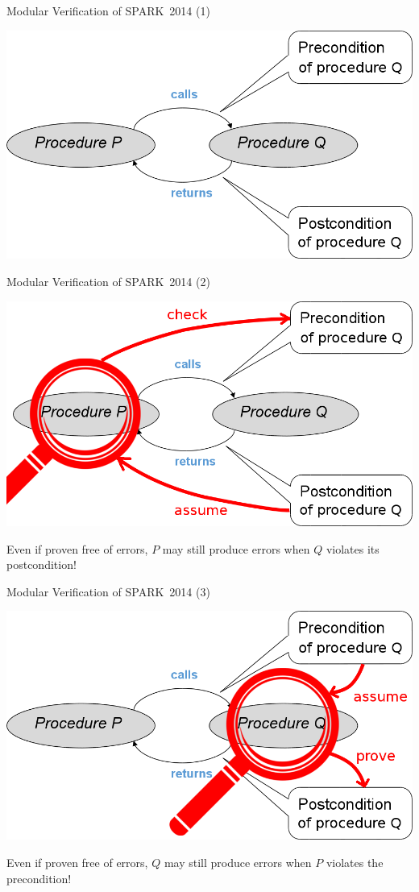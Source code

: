 \begin{frame}[fragile]{Modular Verification of SPARK~2014 (1)}
  \begin{center}
    \includegraphics[width=.9\textwidth]{content/images/spark/pre-post}    
  \end{center}
\end{frame}
\begin{frame}[fragile]{Modular Verification of SPARK~2014 (2)} 
  \begin{center}
    \includegraphics[width=.9\textwidth]{content/images/spark/pre-post-caller}
  \end{center}
  Even if proven free of errors, $P$ may still produce errors when $Q$ violates its postcondition!
\end{frame}
\begin{frame}[fragile]{Modular Verification of SPARK~2014 (3)}
  \begin{center}
    \includegraphics[width=.9\textwidth]{content/images/spark/pre-post-callee}
  \end{center}
Even if proven free of errors, $Q$ may still produce errors when $P$ violates the precondition!
\end{frame}
\addtocounter{clock}{4}

